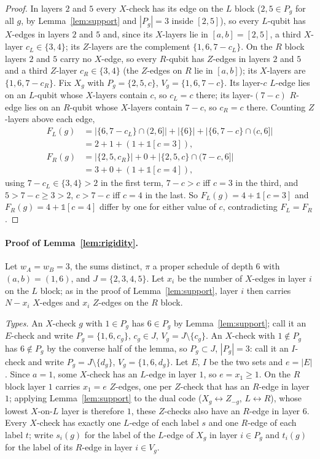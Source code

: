 \documentclass[reprint,twocolumn,superscriptaddress,nofootinbib]{revtex4-2}
\theoremstyle{plain}
\newcommand{\wA}{w_A}                  %
\newcommand{\wB}{w_B}
\begin{document}
\begin{proof}
In layers $2$ and $5$ every $X$-check has its edge on the $L$ block
($2,5\in P_g$ for all $g$, by Lemma~\ref{lem:support} and $|P_g|=3$ inside
$[2,5]$), so every $L$-qubit has $X$-edges in layers $2$ and $5$ and,
since its $X$-layers lie in $[a,b]=[2,5]$, a third $X$-layer
$c_L\in\{3,4\}$; its $Z$-layers are the complement $\{1,6,7-c_L\}$. On the
$R$ block layers $2$ and $5$ carry no $X$-edge, so every $R$-qubit has
$Z$-edges in layers $2$ and $5$ and a third $Z$-layer $c_R\in\{3,4\}$ (the
$Z$-edges on $R$ lie in $[a,b]$); its $X$-layers are $\{1,6,7-c_R\}$. Fix
$X_g$ with $P_g=\{2,5,c\}$, $V_g=\{1,6,7-c\}$. Its layer-$c$ $L$-edge lies
on an $L$-qubit whose $X$-layers contain $c$, so $c_L=c$ there; its
layer-$(7-c)$ $R$-edge lies on an $R$-qubit whose $X$-layers contain
$7-c$, so $c_R=c$ there. Counting $Z$-layers above each edge,
\begin{align*}
F_L(g)&=|\{6,7-c_L\}\cap(2,6]|+|\{6\}|+|\{6,7-c\}\cap(c,6]|\\
      &=2+1+(1+\mathbb{1}[c=3]),\\
F_R(g)&=|\{2,5,c_R\}|+0+|\{2,5,c\}\cap(7-c,6]|\\
      &=3+0+(1+\mathbb{1}[c=4]),
\end{align*}
using $7-c_L\in\{3,4\}>2$ in the first term, $7-c>c$ iff $c=3$ in the
third, and $5>7-c\ge3>2$, $c>7-c$ iff $c=4$ in the last. So
$F_L(g)=4+\mathbb{1}[c=3]$ and $F_R(g)=4+\mathbb{1}[c=4]$ differ by one
for either value of $c$, contradicting $F_L=F_R$.
\end{proof}

\paragraph*{Proof of Lemma~\ref{lem:rigidity}.}
Let $\wA=\wB=3$, the sums distinct, $\pi$ a proper schedule of depth $6$
with $(a,b)=(1,6)$, and $J=\{2,3,4,5\}$. Let $x_i$ be the number of
$X$-edges in layer $i$ on the $L$ block; as in the proof of
Lemma~\ref{lem:support}, layer $i$ then carries $N-x_i$ $X$-edges and
$x_i$ $Z$-edges on the $R$ block.

\emph{Types.} An $X$-check $g$ with $1\in P_g$ has $6\in P_g$ by
Lemma~\ref{lem:support}; call it an $E$-check and write
$P_g=\{1,6,c_g\}$, $c_g\in J$, $V_g=J\setminus\{c_g\}$. An $X$-check with
$1\notin P_g$ has $6\notin P_g$ by the converse half of the lemma, so
$P_g\subset J$, $|P_g|=3$: call it an $I$-check and write
$P_g=J\setminus\{d_g\}$, $V_g=\{1,6,d_g\}$. Let $E$, $I$ be the two sets
and $e=|E|$. Since $a=1$, some $X$-check has an $L$-edge in layer $1$, so
$e=x_1\ge1$. On the $R$ block layer $1$ carries $x_1=e$ $Z$-edges, one
per $Z$-check that has an $R$-edge in layer $1$; applying
Lemma~\ref{lem:support} to the dual code ($X_g\leftrightarrow Z_{-g}$,
$L\leftrightarrow R$), whose lowest $X$-on-$L$ layer is therefore $1$,
these $Z$-checks also have an $R$-edge in layer $6$. Every $X$-check has
exactly one $L$-edge of each label $s$ and one $R$-edge of each label
$t$; write $s_i(g)$ for the label of the $L$-edge of $X_g$ in layer
$i\in P_g$ and $t_i(g)$ for the label of its $R$-edge in layer
$i\in V_g$.
\end{document}
